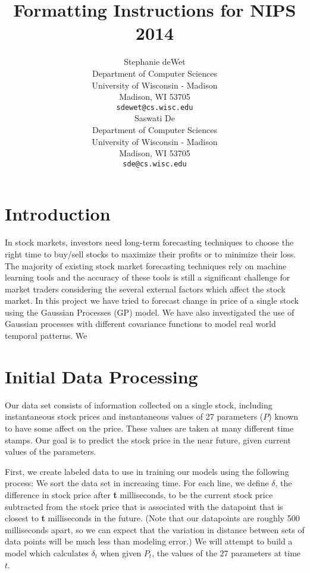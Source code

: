 \documentclass{article} %
\title{Formatting Instructions for NIPS 2014}
\author{
Stephanie deWet \\
Department of Computer Sciences\\
University of Wisconsin - Madison \\
Madison, WI 53705 \\
\texttt{sdewet@cs.wisc.edu} \\
\And
Saswati De \\
Department of Computer Sciences\\
University of Wisconsin - Madison \\
Madison, WI 53705 \\
\texttt{sde@cs.wisc.edu} \\
}
\begin{document}
\maketitle

\begin{abstract}
\end{abstract}

\section{Introduction}
In stock markets, investors need long-term forecasting techniques to choose the right time to buy/sell stocks to maximize their profits or to minimize their loss. The majority of existing stock market forecasting techniques rely on machine learning tools and the accuracy of these tools is still a significant challenge for market traders considering the several external factors which affect the stock market. In this project we have tried to forecast change in price of a single stock using the Gaussian Processes (GP) model. We have also investigated the use of Gaussian processes with different covariance functions to model real world temporal patterns. We 

\section{Initial Data Processing}
Our data set consists of information collected on a single stock, including instantaneous stock prices and instantaneous values of 27 parameters ($P$) known to have some affect on the price.
These values are taken at many different time stamps.
Our goal is to predict the stock price in the near future, given current values of the parameters.

First, we create labeled data to use in training our models using the following process:
We sort the data set in increasing time.
For each line, we define $\delta$, the difference in stock price after \textbf{t} milliseconds, to be the current stock price subtracted from the stock price that is associated with the datapoint that is closest to \textbf{t} milliseconds in the future.
(Note that our datapoints are roughly 500 milliseconds apart, so we can expect that the variation in distance between sets of data points will be much less than modeling error.)
We will attempt to build a model which calculates $\delta_t$ when given $P_t$, the values of the 27 parameters at time $t$.

\end{document}
